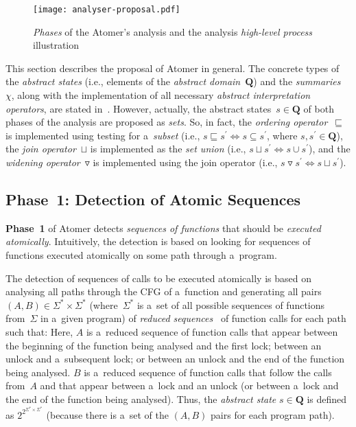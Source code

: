 \documentclass{ExcelAtFIT}
\theoremstyle{definition}
\begin{document}
\begin{figure}[hbt]
    \centering
    \texttt{[image: analyser-proposal.pdf]}
    \caption{\emph{Phases} of the Atomer's analysis and the analysis \emph{high-level process} illustration}
    \label{fig:atomerPhasesSequences}
\end{figure}

This section describes the proposal of Atomer in general. The concrete types of the \emph{abstract states} (i.e., elements of the \emph{abstract domain}~$ \boldsymbol{Q} $) and the \emph{summaries}~$ \chi $, along with the implementation of all necessary \emph{abstract interpretation operators}, are stated in~\cite{harmimBP}. However, actually, the abstract states~$ s \in \boldsymbol{Q} $ of both phases of the analysis are proposed as \emph{sets}. So, in fact, the \emph{ordering operator}~$ \sqsubseteq $ is implemented using testing for a~\emph{subset} (i.e., $ s \sqsubseteq s^\prime \Leftrightarrow s \subseteq s^\prime $, where $ s, s^\prime \in \boldsymbol{Q} $), the \emph{join operator}~$ \sqcup $ is implemented as the \emph{set union} (i.e., $ s \sqcup s^\prime \Leftrightarrow s \cup s^\prime $), and the \emph{widening operator}~$ \triangledown $ is implemented using the join operator (i.e., $ s \triangledown s^\prime \Leftrightarrow s \sqcup s^\prime $).

\subsection{Phase~1: Detection of Atomic Sequences}

\textbf{Phase~1} of Atomer detects \emph{sequences of functions} that should be \emph{executed atomically}. Intuitively, the detection is based on looking for sequences of functions executed atomically on some path through a~program.

The detection of sequences of calls to be executed atomically is based on analysing all paths through the CFG of a~function and generating all pairs $ {(A, B)} \in {\Sigma^* \times \Sigma^*} $ (where~$ \Sigma^* $ is a~set of all possible sequences of functions from~$ \Sigma $ in a~given program) of \emph{reduced sequences}~\cite{harmimBP} of function calls for each path such that: Here, $ A $ is a~reduced sequence of function calls that appear between the beginning of the function being analysed and the first lock; between an unlock and a~subsequent lock; or between an unlock and the end of the function being analysed. $ B $ is a~reduced sequence of function calls that follow the calls from~$ A $ and that appear between a~lock and an unlock (or between a~lock and the end of the function being analysed). Thus, the \emph{abstract state} $ s \in \boldsymbol{Q} $ is defined as $ 2^{2^{\Sigma^* \times \Sigma^*}} $ (because there is a~set of the ${ (A, B) }$ pairs for each program path).
\end{document}
